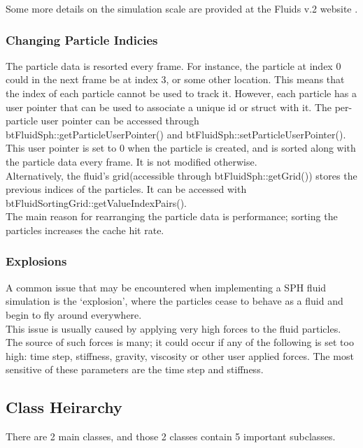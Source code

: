 \documentclass[]{article}
\begin{document}
			Some more details on the simulation scale are provided at the Fluids v.2 website \cite{RH:2008}.
			
		\subsubsection{Changing Particle Indicies}
			The particle data is resorted every frame. For instance, the particle at index 0 could in the next frame be
			at index 3, or some other location. This means that the index of each particle cannot be used to track it. 
			However, each particle has a user pointer that can be used to associate a unique id or struct with it. The 
			per-particle user pointer can be accessed through btFluidSph::getParticleUserPointer() and 
			btFluidSph::setParticleUserPointer(). This user pointer is set to 0 when the particle is created, and is 
			sorted along with the particle data every frame. It is not modified otherwise.\\
			
			Alternatively, the fluid's grid(accessible through btFluidSph::getGrid()) stores the previous indices
			of the particles. It can be accessed with btFluidSortingGrid::getValueIndexPairs().\\
			
			The main reason for rearranging the particle data is performance; sorting the particles increases the cache 
			hit rate.
		
		\subsubsection{Explosions}
			A common issue that may be encountered when implementing a SPH fluid simulation is the `explosion', where 
			the particles cease to behave as a fluid and begin to fly around everywhere.\\
			
			This issue is usually caused by applying very high forces to the fluid particles. The source of such forces 
			is many; it could occur if any of the following is set too high: time step, stiffness, gravity, viscosity 
			or other user applied forces. The most sensitive of these parameters are the time step and stiffness.
	
	\subsection{Class Heirarchy}
		There are 2 main classes, and those 2 classes contain 5 important subclasses.
	
\end{document}
